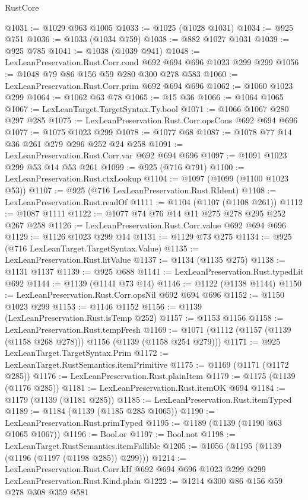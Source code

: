 \begin{lexlean}{RustCore}
\begin{coremodule}
@1031 := @1029 @963 @1005
@1033 := @1025 (@1028 @1031)
@1034 := @925 @751
@1036 := @1033 (@1034 @759)
@1038 := @882 @1027 @1031
@1039 := @925 @785
@1041 := @1038 (@1039 @941)
@1048 := LexLeanPreservation.Rust.Corr.cond @692 @694 @696 @1023 @299 @299
@1056 := @1048 @79 @86 @156 @59 @280 @300 @278 @583
@1060 := LexLeanPreservation.Rust.Corr.prim @692 @694 @696
@1062 := @1060 @1023 @299
@1064 := @1062 @63 @78
@1065 := @15 @36
@1066 := @1064 @1065
@1067 := LexLeanTarget.TargetSyntax.Ty.bool
@1071 := @1066 @1067 @280 @297 @285
@1075 := LexLeanPreservation.Rust.Corr.opsCons @692 @694 @696
@1077 := @1075 @1023 @299
@1078 := @1077 @68
@1087 := @1078 @77 @14 @36 @261 @279 @296 @252 @24 @258
@1091 := LexLeanPreservation.Rust.Corr.var @692 @694 @696
@1097 := @1091 @1023 @299 @53 @14 @53 @261
@1099 := @925 (@716 @791)
@1100 := LexLeanPreservation.Rust.ctxLookup
@1104 := @1097 (@1099 (@1100 @1023 @53))
@1107 := @925 (@716 LexLeanPreservation.Rust.RIdent)
@1108 := LexLeanPreservation.Rust.readOf
@1111 := @1104 (@1107 (@1108 @261))
@1112 := @1087 @1111
@1122 := @1077 @74 @76 @14 @11 @275 @278 @295 @252 @267 @258
@1126 := LexLeanPreservation.Rust.Corr.value @692 @694 @696
@1129 := @1126 @1023 @299 @14
@1131 := @1129 @73 @275
@1134 := @925 (@716 LexLeanTarget.TargetSyntax.Value)
@1135 := LexLeanPreservation.Rust.litValue
@1137 := @1134 (@1135 @275)
@1138 := @1131 @1137
@1139 := @925 @688
@1141 := LexLeanPreservation.Rust.typedLit @692
@1144 := @1139 (@1141 @73 @14)
@1146 := @1122 (@1138 @1144)
@1150 := LexLeanPreservation.Rust.Corr.opsNil @692 @694 @696
@1152 := @1150 @1023 @299
@1153 := @1146 @1152
@1156 := @1139 (LexLeanPreservation.Rust.isTemp @252)
@1157 := @1153 @1156
@1158 := LexLeanPreservation.Rust.tempFresh
@1169 := @1071 (@1112 (@1157 (@1139 (@1158 @268 @278))) @1156 (@1139 (@1158 @254 @279)))
@1171 := @925 LexLeanTarget.TargetSyntax.Prim
@1172 := LexLeanTarget.RustSemantics.itemPrimitive
@1175 := @1169 (@1171 (@1172 @285))
@1176 := LexLeanPreservation.Rust.plainItem
@1179 := @1175 (@1139 (@1176 @285))
@1181 := LexLeanPreservation.Rust.itemOK @694
@1184 := @1179 (@1139 (@1181 @285))
@1185 := LexLeanPreservation.Rust.itemTyped
@1189 := @1184 (@1139 (@1185 @285 @1065))
@1190 := LexLeanPreservation.Rust.primTyped
@1195 := @1189 (@1139 (@1190 @63 @1065 @1067))
@1196 := Bool.or
@1197 := Bool.not
@1198 := LexLeanTarget.RustSemantics.itemFallible
@1205 := @1056 (@1195 (@1139 (@1196 (@1197 (@1198 @285)) @299)))
@1214 := LexLeanPreservation.Rust.Corr.kIf
    @692
    @694
    @696
    @1023
    @299
    @299
    LexLeanPreservation.Rust.Kind.plain
@1222 := @1214 @300 @86 @156 @59 @278 @308 @359 @581

\end{coremodule}
\end{lexlean}
